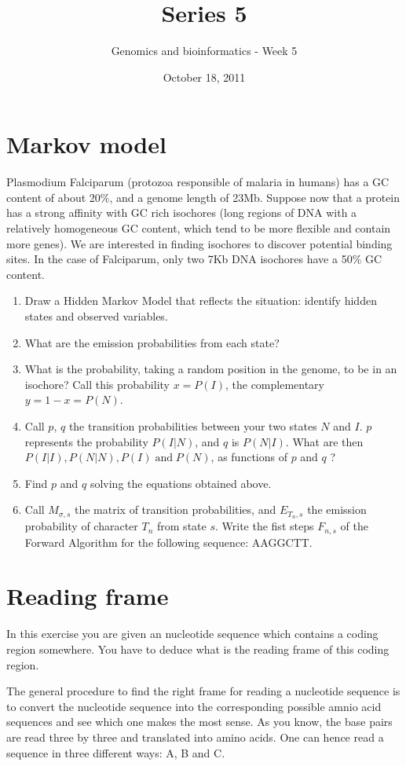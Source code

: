 \documentclass[a4paper,11pt]{article}
\title{Series 5}
\date{October 18, 2011}
\author{Genomics and bioinformatics - Week 5}
\begin{document}
\maketitle

\section{Markov model}
Plasmodium Falciparum (protozoa responsible of malaria in humans) has a GC content of about 20\%, and a genome length of 23Mb. Suppose now that a protein has a strong affinity with GC rich isochores (long regions of DNA with a relatively homogeneous GC content, which tend to be more flexible and contain more genes). We are interested in finding isochores to discover potential binding sites. In the case of Falciparum, only two 7Kb DNA isochores have a 50\% GC content. 
\begin{enumerate}
\item Draw a Hidden Markov Model that reflects the situation: identify hidden states and observed variables.
\item What are the emission probabilities from each state?
\item What is the probability, taking a random position in the genome, to be in an isochore? Call this probability $x = P(I)$, the complementary $y = 1-x = P(N)$.
\item Call $p$, $q$ the transition probabilities between your two states $N$ and $I$. $p$ represents the probability $P(I|N)$, and $q$ is $P(N|I)$. What are then $P(I|I), P(N|N), P(I) \;\text{and}\; P(N)$, as functions of $p$ and $q$ ?
\item Find $p$ and $q$ solving the equations obtained above.
\item Call $M_{\sigma,s}$ the matrix of transition probabilities, and $E_{T_n,s}$ the emission probability of character $T_n$ from state $s$. Write the fist steps $F_{n,s}$ of the Forward Algorithm for the following sequence: AAGGCTT.
\end{enumerate}

\section{Reading frame}
In this exercise you are given an nucleotide sequence which contains a coding region somewhere. You have to deduce what is the reading frame of this coding region.

The general procedure to find the right frame for reading a nucleotide sequence is to convert the nucleotide sequence into the corresponding possible amnio acid sequences and see which one makes the most sense. As you know, the base pairs are read three by three and translated into amino acids. One can hence read a sequence in three different ways: A, B and C.
\end{document}
